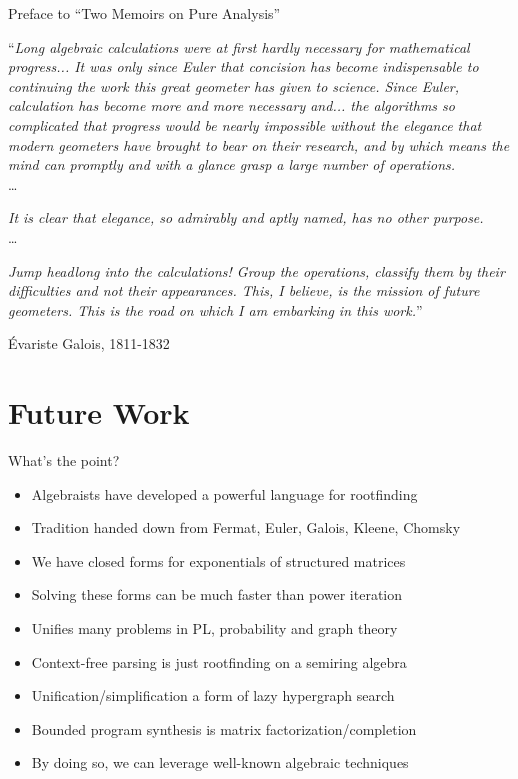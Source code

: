 \documentclass{beamer}
\begin{document}
\begin{frame}{Preface to “Two Memoirs on Pure Analysis”}
  \setlength{\epigraphwidth}{0.97\textwidth}
  \epigraph{``\textit{Long algebraic calculations were at first hardly necessary for mathematical progress... It was only since Euler that concision has become indispensable to continuing the work this great geometer has given to science. Since Euler, calculation has become more and more necessary and... the algorithms so complicated that progress would be nearly impossible without the elegance that modern geometers have brought to bear on their research, and by which means the mind can promptly and with a glance grasp a large number of operations.}\\

  \vspace{5pt}
  \ldots\\
  \vspace{5pt}

  \textit{It is clear that elegance, so admirably and aptly named, has no other purpose.}\\

  \vspace{5pt}
  \ldots\\
  \vspace{5pt}

  \textit{Jump headlong into the calculations! Group the operations, classify them by their difficulties and not their appearances. This, I believe, is the mission of future geometers. This is the road on which I am embarking in this work.}''}{\'Evariste Galois, 1811-1832}
\end{frame}


\section{Future Work}

\begin{frame}{What's the point?}
  \begin{itemize}
    \item Algebraists have developed a powerful language for rootfinding
    \item Tradition handed down from Fermat, Euler, Galois, Kleene, Chomsky
    \item We have closed forms for exponentials of structured matrices
    \item Solving these forms can be much faster than power iteration
    \item Unifies many problems in PL, probability and graph theory
    \item Context-free parsing is just rootfinding on a semiring algebra
    \item Unification/simplification a form of lazy hypergraph search
    \item Bounded program synthesis is matrix factorization/completion
    \item By doing so, we can leverage well-known algebraic techniques
  \end{itemize}
\end{frame}
\end{document}
